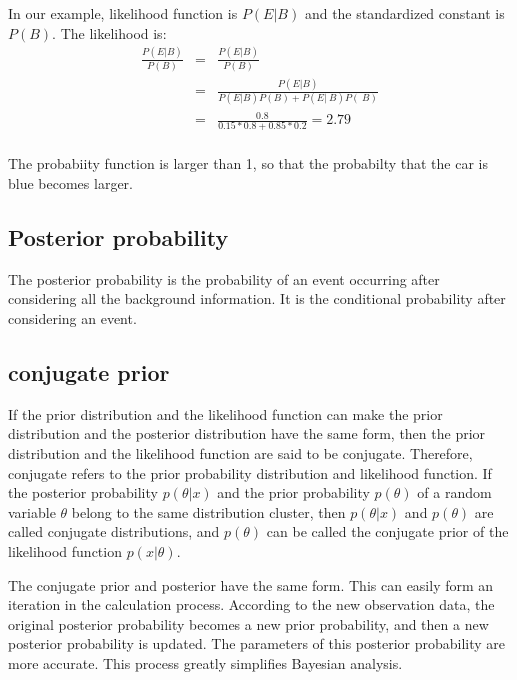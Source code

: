 In our example, likelihood function is $P(E|B)$ and the standardized constant is $P(B)$. The likelihood is:
\begin{eqnarray*}
  \frac{P(E|B)}{P(B)}  &=& \frac{P(E|B)}{P(B)}  \\
  & = & \frac{P(E|B)}{P(E|B)P(B)+P(E|~B)P(~B)} \\
  & = & \frac{0.8}{0.15*0.8 + 0.85 * 0.2} = 2.79\\
\end{eqnarray*}

The probabiity function is larger than 1, so that the probabilty that the car is blue becomes larger.

\subsection{Posterior probability}
The posterior probability is the probability of an event occurring after considering all the background information. It is the conditional probability after considering an event.

\subsection{conjugate prior}
If the prior distribution and the likelihood function can make the prior distribution and the posterior distribution  have the same form, then the prior distribution and the likelihood function are said to be conjugate. Therefore, conjugate refers to the prior probability distribution and likelihood function. If the posterior probability $p(\theta|x)$ and the  prior probability $p(\theta)$ of a random variable $\theta$ belong to the same distribution cluster, then $p(\theta|x)$ and $p(\theta)$ are called conjugate distributions, and  $p(\theta)$ can be called the conjugate prior of the likelihood function $p(x|\theta)$.

The conjugate prior and posterior have the same form. This can easily form an iteration in the calculation process. According to the new observation data, the original posterior probability becomes a new prior probability, and then a new posterior probability is updated. The parameters of this posterior probability are more accurate. This process greatly simplifies Bayesian analysis.
